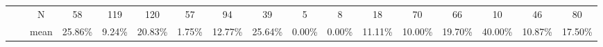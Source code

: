 \documentclass{sigchi}
\begin{document}
\begin{table}[t]
\begin{adjustbox}{width=1\textwidth}
\begin{tabular}{ccccccccccccccccc}
			\multicolumn{1}{|c|}{}                               & \multicolumn{1}{c|}{}                        & \multicolumn{1}{c|}{N}     & \multicolumn{1}{c|}{\cellcolor[HTML]{ACDDAA}58}           & \multicolumn{1}{c|}{\cellcolor[HTML]{ACDDAA}119}         & \multicolumn{1}{c|}{\cellcolor[HTML]{ACDDAA}120}          & \multicolumn{1}{c|}{\cellcolor[HTML]{ACDDAA}57}          & \multicolumn{1}{c|}{\cellcolor[HTML]{FFFFC7}94}                & \multicolumn{1}{c|}{\cellcolor[HTML]{FFFFC7}39}             & \multicolumn{1}{c|}{\cellcolor[HTML]{FFFFC7}5}        & \multicolumn{1}{c|}{\cellcolor[HTML]{FFFFC7}8}       & \multicolumn{1}{c|}{\cellcolor[HTML]{FFFFC7}18}      & \multicolumn{1}{c|}{\cellcolor[HTML]{FFFFC7}70}      & \multicolumn{1}{c|}{\cellcolor[HTML]{FFFFC7}66}      & \multicolumn{1}{c|}{\cellcolor[HTML]{FFFFC7}10}      & \multicolumn{1}{c|}{46}                                   & \multicolumn{1}{c|}{80}                                  \\ \cline{3-17} 
			\multicolumn{1}{|c|}{}                               & \multicolumn{1}{c|}{}                        & \multicolumn{1}{c|}{mean}  & \multicolumn{1}{c|}{\cellcolor[HTML]{ACDDAA}25.86\%}      & \multicolumn{1}{c|}{\cellcolor[HTML]{ACDDAA}9.24\%}      & \multicolumn{1}{c|}{\cellcolor[HTML]{ACDDAA}20.83\%}      & \multicolumn{1}{c|}{\cellcolor[HTML]{ACDDAA}1.75\%}      & \multicolumn{1}{c|}{\cellcolor[HTML]{FFFFC7}12.77\%}           & \multicolumn{1}{c|}{\cellcolor[HTML]{FFFFC7}25.64\%}        & \multicolumn{1}{c|}{\cellcolor[HTML]{FFFFC7}0.00\%}   & \multicolumn{1}{c|}{\cellcolor[HTML]{FFFFC7}0.00\%}  & \multicolumn{1}{c|}{\cellcolor[HTML]{FFFFC7}11.11\%} & \multicolumn{1}{c|}{\cellcolor[HTML]{FFFFC7}10.00\%} & \multicolumn{1}{c|}{\cellcolor[HTML]{FFFFC7}19.70\%} & \multicolumn{1}{c|}{\cellcolor[HTML]{FFFFC7}40.00\%} & \multicolumn{1}{c|}{10.87\%}                              & \multicolumn{1}{c|}{17.50\%}                             \\ \cline{3-17} 

\end{tabular}
\end{adjustbox}
\end{table}
\end{document}
